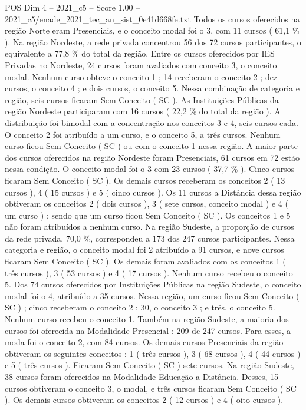 \begin{textsample}{POS Dim 4 – 2021\_c5 – Score 1.00 – 2021\_c5/enade\_2021\_tec\_an\_sist\_0e41d668fe.txt}
Todos os cursos oferecidos na região Norte eram Presenciais, e o conceito modal foi o 3, com 11 cursos ( 61,1 \% ).
Na região Nordeste, a rede privada concentrou 56 dos 72 cursos participantes, o equivalente a 77,8 \% do total da região.
Entre os cursos oferecidos por IES Privadas no Nordeste, 24 cursos foram avaliados com conceito 3, o conceito modal.
Nenhum curso obteve o conceito 1 ; 14 receberam o conceito 2 ; dez cursos, o conceito 4 ; e dois cursos, o conceito 5.
Nessa combinação de categoria e região, seis cursos ficaram Sem Conceito ( SC ).
As Instituições Públicas da região Nordeste participaram com 16 cursos ( 22,2 \% do total da região ).
A distribuição foi bimodal com a concentração nos conceitos 3 e 4, seis cursos cada.
O conceito 2 foi atribuído a um curso, e o conceito 5, a três cursos.
Nenhum curso ficou Sem Conceito ( SC ) ou com o conceito 1 nessa região.
A maior parte dos cursos oferecidos na região Nordeste foram Presenciais, 61 cursos em 72 estão nessa condição.
O conceito modal foi o 3 com 23 cursos ( 37,7 \% ).
Cinco cursos ficaram Sem Conceito ( SC ).
Os demais cursos receberam os conceitos 2 ( 13 cursos ), 4 ( 15 cursos ) e 5 ( cinco cursos ).
Os 11 cursos a Distância dessa região obtiveram os conceitos 2 ( dois cursos ), 3 ( sete cursos, conceito modal ) e 4 ( um curso ) ; sendo que um curso ficou Sem Conceito ( SC ).
Os conceitos 1 e 5 não foram atribuídos a nenhum curso.
Na região Sudeste, a proporção de cursos da rede privada, 70,0 \%, correspondeu a 173 dos 247 cursos participantes.
Nessa categoria e região, o conceito modal foi 2 atribuído a 91 cursos, e nove cursos ficaram Sem Conceito ( SC ).
Os demais foram avaliados com os conceitos 1 ( três cursos ), 3 ( 53 cursos ) e 4 ( 17 cursos ).
Nenhum curso recebeu o conceito 5.
Dos 74 cursos oferecidos por Instituições Públicas na região Sudeste, o conceito modal foi o 4, atribuído a 35 cursos.
Nessa região, um curso ficou Sem Conceito ( SC ) ; cinco receberam o conceito 2 ; 30, o conceito 3 ; e três, o conceito 5.
Nenhum curso recebeu o conceito 1.
Também na região Sudeste, a maioria dos cursos foi oferecida na Modalidade Presencial : 209 de 247 cursos.
Para esses, a moda foi o conceito 2, com 84 cursos.
Os demais cursos Presenciais da região obtiveram os seguintes conceitos : 1 ( três cursos ), 3 ( 68 cursos ), 4 ( 44 cursos ) e 5 ( três cursos ).
Ficaram Sem Conceito ( SC ) sete cursos.
Na região Sudeste, 38 cursos foram oferecidos na Modalidade Educação a Distância.
Desses, 15 cursos obtiveram o conceito 3, o modal, e três cursos ficaram Sem Conceito ( SC ).
Os demais cursos obtiveram os conceitos 2 ( 12 cursos ) e 4 ( oito cursos ).

\end{textsample}
